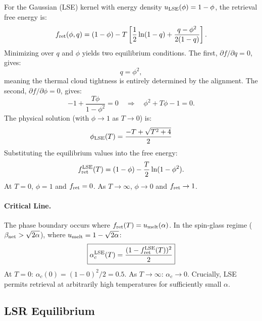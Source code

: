 \documentclass{article}
\theoremstyle{plain}
\theoremstyle{definition}
\theoremstyle{remark}
\begin{document}
For the Gaussian (LSE) kernel with energy density $u_{\rm LSE}(\phi) = 1 - \phi$, the retrieval free energy is:
\begin{equation}
    f_{\rm ret}(\phi, q) = (1 - \phi) - T \left[ \frac{1}{2}\ln(1-q) + \frac{q - \phi^2}{2(1-q)} \right].
\end{equation}
Minimizing over $q$ and $\phi$ yields two equilibrium conditions. The first, $\partial f/\partial q = 0$, gives:
\begin{equation}
    q = \phi^2,
    \label{eq:q_constraint}
\end{equation}
meaning the thermal cloud tightness is entirely determined by the alignment. The second, $\partial f/\partial \phi = 0$, gives:
\begin{equation}
    -1 + \frac{T\phi}{1-\phi^2} = 0 \quad \Rightarrow \quad \phi^2 + T\phi - 1 = 0.
\end{equation}
The physical solution (with $\phi \to 1$ as $T \to 0$) is:
\begin{equation}
    \phi_{\rm LSE}(T) = \frac{-T + \sqrt{T^2 + 4}}{2}
    \label{eq:phi_lse}
\end{equation}
Substituting the equilibrium values into the free energy:
\begin{equation}
    f_{\rm ret}^{\rm LSE}(T) = (1 - \phi) - \frac{T}{2}\ln(1 - \phi^2).
    \label{eq:f_lse}
\end{equation}
At $T = 0$, $\phi = 1$ and $f_{\rm ret} = 0$. As $T \to \infty$, $\phi \to 0$ and $f_{\rm ret} \to 1$.

\paragraph{Critical Line.} The phase boundary occurs where $f_{\rm ret}(T) = u_{\rm melt}(\alpha)$. In the spin-glass regime ($\beta_{\rm net} > \sqrt{2\alpha}$), where $u_{\rm melt} = 1 - \sqrt{2\alpha}$:
\begin{equation}
    \boxed{\alpha_c^{\rm LSE}(T) = \frac{(1 - f_{\rm ret}^{\rm LSE}(T))^2}{2}}
    \label{eq:alpha_lse}
\end{equation}
At $T = 0$: $\alpha_c(0) = (1-0)^2/2 = 0.5$. As $T \to \infty$: $\alpha_c \to 0$. Crucially, LSE permits retrieval at arbitrarily high temperatures for sufficiently small $\alpha$.

\subsection{LSR Equilibrium}
\end{document}

